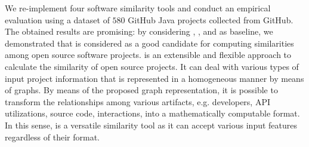 We re-implement four software similarity tools and conduct an empirical evaluation using a dataset of $580$ GitHub Java projects collected from GitHub. The obtained results are promising: by considering \MUDABlue, \CLAN, and \RepoPal as baseline, we demonstrated that \CrossSim is considered as a good candidate for computing similarities among open source software projects. \CrossSim is an extensible and flexible approach to calculate the similarity of open source projects. It can deal with various types of input project information that is represented in a homogeneous manner by means of graphs. By means of the proposed graph representation, it is possible to transform the relationships among various artifacts, e.g. developers, API utilizations, source code, interactions, into a mathematically computable format. In this sense, \CrossSim is a versatile similarity tool as it can accept various input features regardless of their format. %







